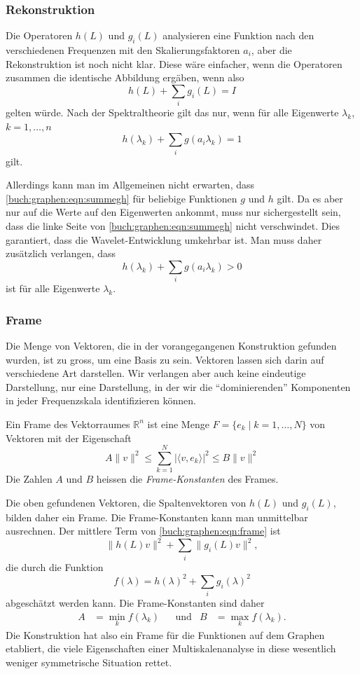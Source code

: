 \subsubsection{Rekonstruktion}
Die Operatoren $h(L)$ und $g_i(L)$ analysieren eine Funktion
nach den verschiedenen Frequenzen mit den Skalierungsfaktoren $a_i$,
aber die Rekonstruktion ist noch nicht klar.
Diese wäre einfacher, wenn die Operatoren zusammen die identische
Abbildung ergäben, wenn also
\[
h(L) + \sum_{i}g_i(L)=I
\]
gelten würde.
Nach der Spektraltheorie gilt das nur, wenn für alle Eigenwerte
$\lambda_k$, $k=1,\dots,n$
\begin{equation}
h(\lambda_k) + \sum_ig(a_i\lambda_k)=1
\label{buch:graphen:eqn:summegh}
\end{equation}
gilt.

Allerdings kann man im Allgemeinen nicht erwarten,
dass \ref{buch:graphen:eqn:summegh} für
beliebige Funktionen $g$ und $h$ gilt.
Da es aber nur auf die Werte auf den Eigenwerten ankommt,
muss nur sichergestellt sein, dass 
die linke Seite von \eqref{buch:graphen:eqn:summegh}
nicht verschwindet.
Dies garantiert, dass die Wavelet-Entwicklung umkehrbar ist.
Man muss daher zusätzlich verlangen, dass
\[
h(\lambda_k) + \sum_{i} g(a_i\lambda_k) > 0
\]
ist für alle Eigenwerte $\lambda_k$.

\subsubsection{Frame}
Die Menge von Vektoren, die in der vorangegangenen Konstruktion gefunden
wurden, ist zu gross, um eine Basis zu sein.
Vektoren lassen sich darin auf verschiedene Art darstellen.
Wir verlangen aber auch keine eindeutige Darstellung, nur eine 
Darstellung, in der wir die ``dominierenden'' Komponenten in jeder
Frequenzskala identifizieren können.

\begin{definition}
\label{buch:graphen:def:frame}
Ein Frame des Vektorraumes $\mathbb{R}^n$ ist eine Menge
$F=\{e_k \mid k=1,\dots,N\}$ von Vektoren mit der Eigenschaft
\begin{equation}
A\|v\|^2
\le
\sum_{k=1}^N  |\langle v,e_k\rangle|^2
\le
B\|v\|^2
\label{buch:graphen:eqn:frame}
\end{equation}
Die Zahlen $A$  und $B$ heissen die {\em Frame-Konstanten} des Frames.
\end{definition}

Die oben gefundenen Vektoren, die Spaltenvektoren von $h(L)$ und $g_i(L)$,
bilden daher ein Frame.
Die Frame-Konstanten kann man unmittelbar ausrechnen.
Der mittlere Term von \eqref{buch:graphen:eqn:frame} ist 
\[
\|h(L) v\|^2
+
\sum_{i} \|g_i(L)v\|^2,
\]
die durch die Funktion
\[
f(\lambda)
=
h(\lambda)^2 + \sum_i g_i(\lambda)^2
\]
abgeschätzt werden kann.
Die Frame-Konstanten sind daher
\[
\begin{aligned}
A&=\min_{k} f(\lambda_k)
&
&\text{und}&
B&=\max_{k} f(\lambda_k).
\end{aligned}
\]
Die Konstruktion hat also ein Frame für die Funktionen auf dem Graphen
etabliert, die viele Eigenschaften einer Multiskalenanalyse in diese
wesentlich weniger symmetrische Situation rettet.




